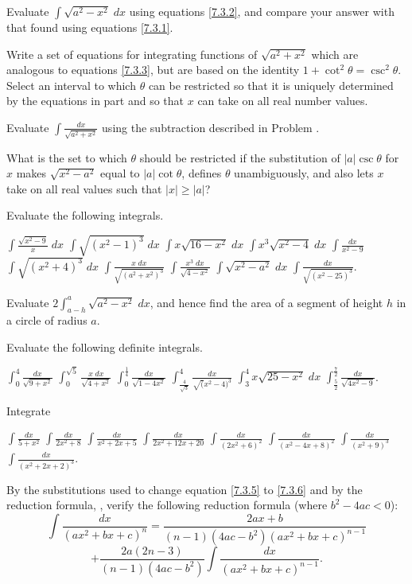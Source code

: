 \begin{exercises}

Evaluate $\int \sqrt{a^2-x^2} \; dx$
using equations \eqref{7.3.2},
and compare your answer with that found
using equations \eqref{7.3.1}.

\begin{exenum}
\x
{}
Write a set of equations for integrating functions
of $\sqrt{a^2+x^2}$ which are analogous
to equations \eqref{7.3.3}, but are based on the
identity $1+\cot^2\theta = \csc^2\theta$.
\x
Select an interval to which $\theta$ can be
restricted so that it is uniquely determined
by the equations in part 
and so that $x$ can take on all real number
values.
\end{exenum}

Evaluate $\int \frac{dx}{\sqrt{a^2+x^2}}$
using the subtraction described in Problem
.

What is the set to which $\theta$ should be restricted
if the substitution of $|a| \csc \theta$ for $x$
makes $\sqrt{x^2-a^2}$ equal to $|a| \cot \theta$,
defines $\theta$ unambiguously, and also lets
$x$ take on all real values such that
$|x| \geq |a|$?

Evaluate the following integrals.
\begin{exenum}
\x
$\int \frac{\sqrt{x^2-9}}x \; dx$
\x
$\int \sqrt{(x^2-1)^3} \; dx$
\x
$\int x\sqrt{16-x^2} \; dx$
\x
$\int x^3\sqrt{x^2-4} \; dx$
\x
$\int \frac{dx}{x^2-9}$
\x
$\int \sqrt{(x^2+4)^3} \; dx$
\x
$\int \frac{x \; dx}{\sqrt{(a^2+x^2)^3}}$
\x
$\int \frac{x^3\;dx}{\sqrt{4-x^2}}$
\x
$\int \sqrt{x^2-a^2} \; dx$
\x
$\int \frac{dx}{\sqrt{(x^2-25)^3}}$.
\end{exenum}

Evaluate $2\int_{a-h}^a \sqrt{a^2-x^2} \; dx$,
and hence find the area of a segment of
height $h$ in a circle of radius $a$.

Evaluate the following definite integrals.
\begin{exenum}
\x
$\int_0^4 \frac{dx}{\sqrt{9+x^2}}$
\x
$\int_0^{\sqrt5} \frac{x\;dx}{\sqrt{4+x^2}}$
\x
$\int_0^{\frac14} \frac{dx}{\sqrt{1-4x^2}}$
\x
$\int_{\frac4{\sqrt3}}^4 \frac{dx}{\sqrt(x^2-4)^3}$
\x
$\int_3^4 x\sqrt{25-x^2} \; dx$
\x
$\int_{\frac52}^{\frac72} \frac{dx}{\sqrt{4x^2-9}}$.
\end{exenum}

Integrate
\begin{exenum}
\x
$\int \frac{dx}{5+x^2}$
\x
$\int \frac{dx}{2x^2+8}$
\x
$\int \frac{dx}{x^2+2x+5}$
\x
$\int \frac{dx}{2x^2+12x+20}$
\x
$\int \frac{dx}{(2x^2+6)^2}$
\x
$\int \frac{dx}{(x^2-4x+8)^2}$
\x
$\int \frac{dx}{(x^2+9)^3}$
\x
$\int \frac{dx}{(x^2+2x+2)^3}$.
\end{exenum}

By the substitutions used to change equation
\eqref{7.3.5} to \eqref{7.3.6} and by the reduction
formula, , verify the following reduction
formula (where $b^2-4ac<0$):
\[
\int \frac{dx}{(ax^2+bx+c)^n} =
\frac{2ax+b}{(n-1)(4ac-b^2)(ax^2+bx+c)^{n-1}}
\]
\[
+ \frac{2a(2n-3)}{(n-1)(4ac-b^2)}
\int \frac{dx}{(ax^2+bx+c)^{n-1}}
.
\]

\end{exercises}
